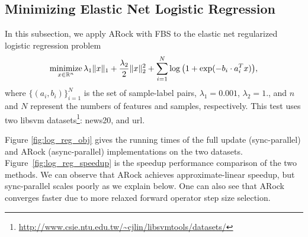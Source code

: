 \subsection{Minimizing Elastic Net Logistic Regression}
In this subsection, we apply ARock with FBS to the elastic net regularized logistic regression problem
\begin{equation}\label{eqn:l12_log}
\operatorname*{minimize}_{x \in \mathbb{R}^n} \lambda_1 \|x\|_1 + \frac{\lambda_2}{2} \|x\|^2_2 + \sum_{i=1}^N \log\big(1 + \exp(-b_i \cdot a_i^T x)\big),
\end{equation}
where $\{(a_i, b_i)\}_{i=1}^N$ is the set of sample-label pairs, $\lambda_1=0.001$, $\lambda_2 = 1.$, and $n$ and $N$ represent the numbers of features and samples, respectively. This test uses two libsvm datasets\footnote{\url{http://www.csie.ntu.edu.tw/~cjlin/libsvmtools/datasets/}}: news20, and url.

Figure \ref{fig:log_reg_obj} gives the running times of  the full update (sync-parallel) and ARock (async-parallel) implementations on the two datasets. Figure~\ref{fig:log_reg_speedup} is the speedup performance comparison of the two methods. We can observe that ARock achieves approximate-linear speedup, but sync-parallel scales poorly as we explain below. One can also see that ARock converges faster due to more relaxed forward operator step size selection.

